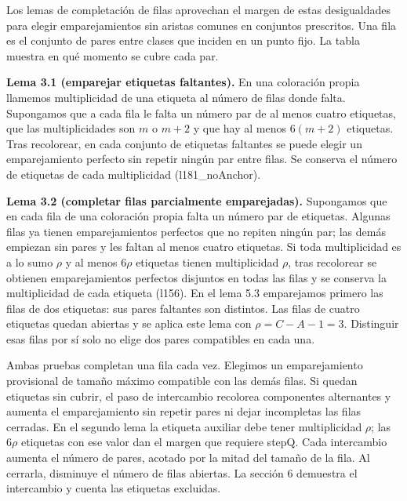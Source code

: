 \documentclass[spanish,11pt,a4paper]{article}
\begin{document}
Los lemas de completación de filas aprovechan el margen de estas desigualdades para elegir emparejamientos sin aristas comunes en conjuntos prescritos. Una fila es el conjunto de pares entre clases que inciden en un punto fijo. La tabla muestra en qué momento se cubre cada par.

\textbf{Lema 3.1 (emparejar etiquetas faltantes).} En una coloración propia llamemos multiplicidad de una etiqueta al número de filas donde falta. Supongamos que a cada fila le falta un número par de al menos cuatro etiquetas, que las multiplicidades son \(m\) o \(m+2\) y que hay al menos \(6(m+2)\) etiquetas. Tras recolorear, en cada conjunto de etiquetas faltantes se puede elegir un emparejamiento perfecto sin repetir ningún par entre filas. Se conserva el número de etiquetas de cada multiplicidad (l181\_noAnchor).

\textbf{Lema 3.2 (completar filas parcialmente emparejadas).} Supongamos que en cada fila de una coloración propia falta un número par de etiquetas. Algunas filas ya tienen emparejamientos perfectos que no repiten ningún par; las demás empiezan sin pares y les faltan al menos cuatro etiquetas. Si toda multiplicidad es a lo sumo \(\rho\) y al menos \(6\rho\) etiquetas tienen multiplicidad \(\rho\), tras recolorear se obtienen emparejamientos perfectos disjuntos en todas las filas y se conserva la multiplicidad de cada etiqueta (l156). En el lema 5.3 emparejamos primero las filas de dos etiquetas: sus pares faltantes son distintos. Las filas de cuatro etiquetas quedan abiertas y se aplica este lema con \(\rho=C-A-1=3\). Distinguir esas filas por sí solo no elige dos pares compatibles en cada una.

Ambas pruebas completan una fila cada vez. Elegimos un emparejamiento provisional de tamaño máximo compatible con las demás filas. Si quedan etiquetas sin cubrir, el paso de intercambio recolorea componentes alternantes y aumenta el emparejamiento sin repetir pares ni dejar incompletas las filas cerradas. En el segundo lema la etiqueta auxiliar debe tener multiplicidad \(\rho\); las \(6\rho\) etiquetas con ese valor dan el margen que requiere stepQ. Cada intercambio aumenta el número de pares, acotado por la mitad del tamaño de la fila. Al cerrarla, disminuye el número de filas abiertas. La sección 6 demuestra el intercambio y cuenta las etiquetas excluidas.
\end{document}
